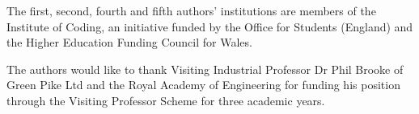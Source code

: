 \documentclass[conference]{IEEEtran}
\begin{document}

The first, second, fourth and fifth authors' institutions are members of the Institute of Coding, an initiative funded by the Office for Students (England) and the Higher Education Funding Council for Wales.

The authors would like to thank Visiting Industrial Professor Dr Phil Brooke of Green Pike Ltd and the Royal Academy of Engineering for funding his position through the Visiting Professor Scheme for three academic years.



%

\end{document}
